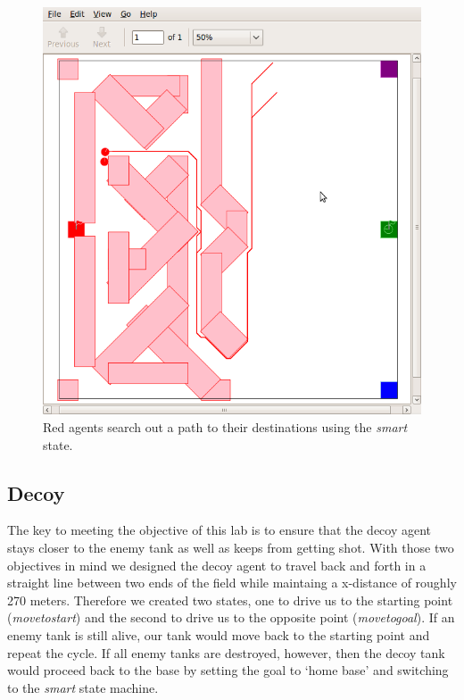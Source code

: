 \begin{figure}\label{fig:search}
\begin{center}
\includegraphics[width=\textwidth]{01paths.png}
\caption{Red agents search out a path to their destinations using the \emph{smart} state.}
\end{center}
\end{figure}

\subsection{Decoy}

The key to meeting the objective of this lab is to ensure that the decoy agent stays closer to the enemy tank as well as keeps from getting shot.  With those two objectives in mind we designed the decoy agent to travel back and forth in a straight line between two ends of the field while maintaing a x-distance of roughly 270 meters.  Therefore we created two states, one to drive us to the starting point (\emph{move\textunderscore to\textunderscore start}) and the second to drive us to the opposite point (\emph{move\textunderscore to\textunderscore goal}).  If an enemy tank is still alive, our tank would move back to the starting point and repeat the cycle.  If all enemy tanks are destroyed, however, then the decoy tank would proceed back to the base by setting the goal to `home base' and switching to the \emph{smart} state machine.

